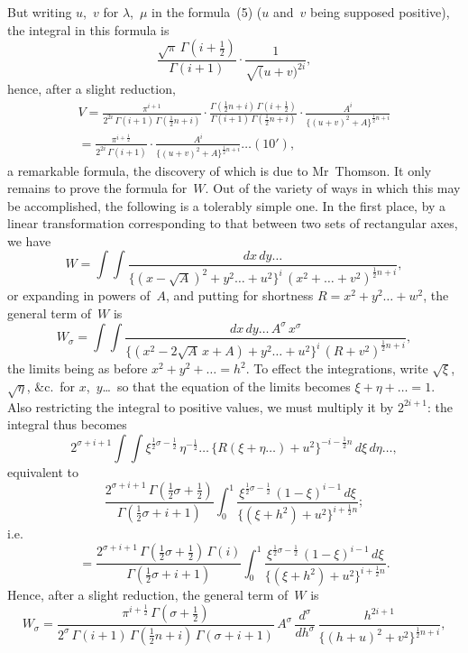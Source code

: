 \documentclass[11pt,a4paper]{book}
\begin{document}
\newpage
But writing $u$,~$v$ for $\lambda$,~$\mu$ in the formula~(5) ($u$ and~$v$ being supposed positive), the integral in this formula is
\[
\frac{\sqrt{\pi}\,\Gamma(i+\frac{1}{2})}{\Gamma(i+1)} \cdot \frac{1}{\surd(u+v)^{2i}},
\]
hence, after a slight reduction,
\begin{multline*}
V = \frac{\pi^{i+1}}{2^{2i}\,\Gamma(i+1)\,\Gamma(\frac{1}{2}n+i)} \cdot \frac{\Gamma(\frac{1}{2}n+i)\,\Gamma(i+\frac{1}{2})}{\Gamma(i+1)\,\Gamma(\frac{1}{2}n+i)} \cdot \frac{A^i}{\{(u+v)^2 + A\}^{\frac{1}{2}n+i}} \\
= \frac{\pi^{i+\frac{1}{2}}}{2^{2i}\,\Gamma(i+1)} \cdot \frac{A^i}{\{(u+v)^2 + A\}^{\frac{1}{2}n+i}} \ldots(10'),
\end{multline*}
a remarkable formula, the discovery of which is due to Mr~Thomson. It only remains to prove the formula for~$W$. Out of the variety of ways in which this may be accomplished, the following is a tolerably simple one. In the first place, by a linear transformation corresponding to that between two sets of rectangular axes, we have
\[
W = \int\!\!\int \frac{dx\,dy\ldots}{\{(x-\surd A)^2 + y^2\ldots + u^2\}^i \, (x^2 + \ldots + v^2)^{\frac{1}{2}n+i}},
\]
or expanding in powers of~$A$, and putting for shortness $R = x^2 + y^2\ldots + w^2$, the general term of~$W$ is
\[
W_\sigma = \int\!\!\int \frac{dx\,dy\ldots\,A^\sigma\,x^\sigma}{\{(x^2 - 2\surd A\,x + A) + y^2\ldots + u^2\}^i \, (R + v^2)^{\frac{1}{2}n+i}},
\]
the limits being as before $x^2 + y^2 + \ldots = h^2$. To effect the integrations, write $\surd\xi$, $\surd\eta$, \&c.\ for $x$,~$y$\ldots\ so that the equation of the limits becomes $\xi + \eta + \ldots = 1$. Also restricting the integral to positive values, we must multiply it by $2^{2i+1}$: the integral thus becomes
\[
2^{\sigma+i+1} \int\!\!\int \xi^{\frac{1}{2}\sigma - \frac{1}{2}} \, \eta^{-\frac{1}{2}} \ldots \, \{R(\xi + \eta\ldots) + u^2\}^{-i-\frac{1}{2}n} \, d\xi\,d\eta\ldots,
\]
equivalent to
\[
\frac{2^{\sigma+i+1}\,\Gamma(\frac{1}{2}\sigma + \frac{1}{2})}{\Gamma(\frac{1}{2}\sigma + i + 1)} \int_0^1 \frac{\xi^{\frac{1}{2}\sigma - \frac{1}{2}} \, (1-\xi)^{i-1}\,d\xi}{\{(\xi + h^2) + u^2\}^{i+\frac{1}{2}n}};
\]
i.e.
\[
= \frac{2^{\sigma+i+1}\,\Gamma(\frac{1}{2}\sigma + \frac{1}{2})\,\Gamma(i)}{\Gamma(\frac{1}{2}\sigma + i + 1)} \int_0^1 \frac{\xi^{\frac{1}{2}\sigma - \frac{1}{2}} \, (1-\xi)^{i-1}\,d\xi}{\{(\xi + h^2) + u^2\}^{i+\frac{1}{2}n}}.
\]
Hence, after a slight reduction, the general term of~$W$ is
\[
W_\sigma = \frac{\pi^{i+\frac{1}{2}}\,\Gamma(\sigma+\frac{1}{2})}{2^{\sigma}\,\Gamma(i+1)\,\Gamma(\frac{1}{2}n+i)\,\Gamma(\sigma+i+1)} \, A^\sigma \, \frac{d^\sigma}{dh^\sigma} \, \frac{h^{2i+1}}{\{(h+u)^2 + v^2\}^{\frac{1}{2}n+i}},
\]
\end{document}
